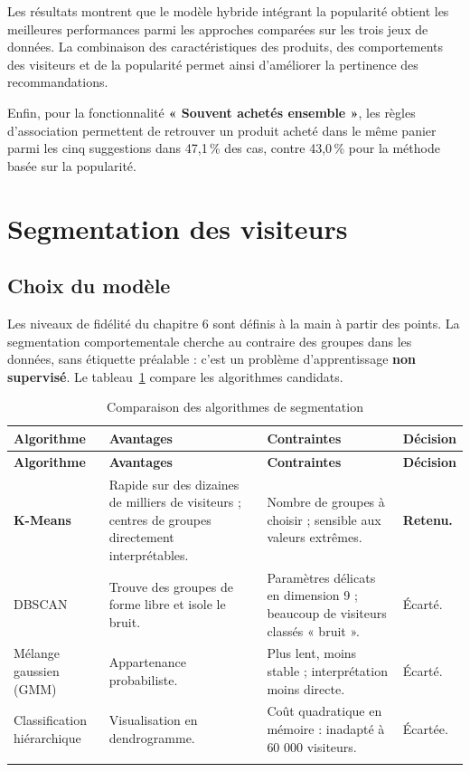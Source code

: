 Les résultats montrent que le modèle hybride intégrant la popularité obtient les meilleures performances parmi les approches comparées sur les trois jeux de données. La combinaison des caractéristiques des produits, des comportements des visiteurs et de la popularité permet ainsi d'améliorer la pertinence des recommandations.



Enfin, pour la fonctionnalité \textbf{« Souvent achetés ensemble »}, les règles d'association permettent de retrouver un produit acheté dans le même panier parmi les cinq suggestions dans 47,1\,\% des cas, contre 43,0\,\% pour la méthode basée sur la popularité.



\section{Segmentation des visiteurs}
\subsection{Choix du modèle}
Les niveaux de fidélité du chapitre 6 sont définis à la main à partir des points. La segmentation comportementale cherche au contraire des groupes dans les données, sans étiquette préalable : c'est un problème d'apprentissage \textbf{non supervisé}. Le tableau~\ref{tab:comparaison-seg} compare les algorithmes candidats.
\renewcommand{\arraystretch}{1.4}
\begin{longtable}{|p{3.1cm}|p{4.3cm}|p{4.3cm}|p{2.5cm}|}
\hline
\textbf{Algorithme} & \textbf{Avantages} & \textbf{Contraintes} & \textbf{Décision} \\
\hline
\endfirsthead
\hline
\textbf{Algorithme} & \textbf{Avantages} & \textbf{Contraintes} & \textbf{Décision} \\
\hline
\endhead
\textbf{K-Means} & Rapide sur des dizaines de milliers de visiteurs ; centres de groupes directement interprétables. & Nombre de groupes à choisir ; sensible aux valeurs extrêmes. & \textbf{Retenu.} \\
\hline
DBSCAN & Trouve des groupes de forme libre et isole le bruit. & Paramètres délicats en dimension 9 ; beaucoup de visiteurs classés « bruit ». & Écarté. \\
\hline
Mélange gaussien (GMM) & Appartenance probabiliste. & Plus lent, moins stable ; interprétation moins directe. & Écarté. \\
\hline
Classification hiérarchique & Visualisation en dendrogramme. & Coût quadratique en mémoire : inadapté à 60 000 visiteurs. & Écartée. \\
\hline
\caption{Comparaison des algorithmes de segmentation}
\label{tab:comparaison-seg}
\end{longtable}




